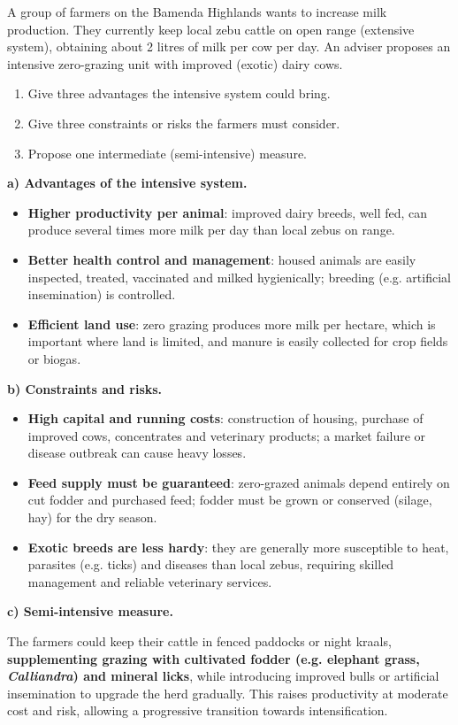 \documentclass[11pt]{article}
\begin{document}
\begin{exoresolu}
A group of farmers on the Bamenda Highlands wants to increase milk production. They currently keep local zebu cattle on open range (extensive system), obtaining about 2 litres of milk per cow per day. An adviser proposes an intensive zero-grazing unit with improved (exotic) dairy cows.
\begin{enumerate}
\item[a)] Give three advantages the intensive system could bring.
\item[b)] Give three constraints or risks the farmers must consider.
\item[c)] Propose one intermediate (semi-intensive) measure.
\end{enumerate}
\tcblower
\textbf{a) Advantages of the intensive system.}
\begin{itemize}
\item \textbf{Higher productivity per animal}: improved dairy breeds, well fed, can produce several times more milk per day than local zebus on range.
\item \textbf{Better health control and management}: housed animals are easily inspected, treated, vaccinated and milked hygienically; breeding (e.g. artificial insemination) is controlled.
\item \textbf{Efficient land use}: zero grazing produces more milk per hectare, which is important where land is limited, and manure is easily collected for crop fields or biogas.
\end{itemize}

\textbf{b) Constraints and risks.}
\begin{itemize}
\item \textbf{High capital and running costs}: construction of housing, purchase of improved cows, concentrates and veterinary products; a market failure or disease outbreak can cause heavy losses.
\item \textbf{Feed supply must be guaranteed}: zero-grazed animals depend entirely on cut fodder and purchased feed; fodder must be grown or conserved (silage, hay) for the dry season.
\item \textbf{Exotic breeds are less hardy}: they are generally more susceptible to heat, parasites (e.g. ticks) and diseases than local zebus, requiring skilled management and reliable veterinary services.
\end{itemize}

\textbf{c) Semi-intensive measure.}

The farmers could keep their cattle in fenced paddocks or night kraals, \textbf{supplementing grazing with cultivated fodder (e.g. elephant grass, \emph{Calliandra}) and mineral licks}, while introducing improved bulls or artificial insemination to upgrade the herd gradually. This raises productivity at moderate cost and risk, allowing a progressive transition towards intensification.
\end{exoresolu}
\end{document}
